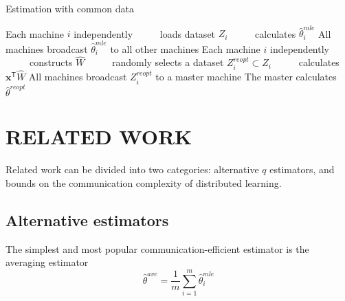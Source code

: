 \documentclass[twoside]{article}
\newcommand{\x}{\mathbf{x}}
\newcommand{\w}{\theta}
\newcommand{\wreopt}{\hat\w^{reopt}}
\newcommand{\wave}{\hat\w^{ave}}
\newcommand{\wmle}{\hat\w^{mle}}
\newcommand{\trans}[1]{\ensuremath{{#1}^{\mathsf{T}}}}
\begin{document}
\begin{algorithm}[t]
\caption{Estimation with common data}
\label{alg:distributed}
\begin{algorithmic}
\State Each machine $i$ independently
\State ~~~~~loads dataset $Z_i$
\State ~~~~~calculates $\wmle_i$
\State All machines broadcast $\wmle_i$ to all other machines
\State Each machine $i$ independently
\State ~~~~~constructs $\hat W$
\State ~~~~~randomly selects a dataset $Z^{reopt}_i\subset Z_i$
\State ~~~~~calculates $\trans\x\hat W$
\State All machines broadcast $Z^{reopt}_i$ to a master machine
\State The master calculates $\wreopt$
\end{algorithmic}
\end{algorithm}

\section{RELATED WORK}

Related work can be divided into two categories:
alternative $q$ estimators,
and bounds on the communication complexity of distributed learning.

\subsection{Alternative estimators}
\label{sec:alt}
The simplest and most popular communication-efficient estimator is the averaging estimator
\begin{equation}
\wave = \frac{1}{m}\sum_{i=1}^m \wmle_i
\end{equation}
\end{document}
